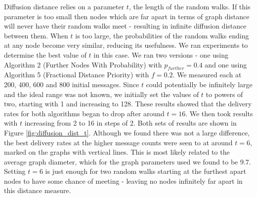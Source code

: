 \documentclass[bsc,frontabs,twoside,singlespacing,parskip,deptreport]{infthesis}     %
\begin{document}
Diffusion distance relies on a parameter $t$, the length of the random walks. If this parameter is too small then nodes which are far apart in terms of graph distance will never have their random walks meet - resulting in infinite diffusion distance between them. When $t$ is too large, the probabilities of the random walks ending at any node become very similar, reducing its usefulness. We ran experiments to determine the best value of $t$ in this case. We ran two versions - one using Algorithm 2 (Further Nodes With Probability) with $p_{further}=0.4$ and one using Algorithm 5 (Fractional Distance Priority) with $f=0.2$. We measured each at 200, 400, 600 and 800 initial messages. Since $t$ could potentially be infinitely large and the ideal range was not known, we initially set the values of $t$ to powers of two, starting with 1 and increasing to 128. These results showed that the delivery rates for both algorithms began to drop after around $t=16$. We then took results with $t$ increasing from 2 to 16 in steps of 2. Both sets of results are shown in Figure \ref{fig:diffusion_dist_t}. Although we found there was not a large difference, the best delivery rates at the higher message counts were seen to at around $t=6$, marked on the graphs with vertical lines. This is most likely related to the average graph diameter, which for the graph parameters used we found to be 9.7. Setting $t=6$ is just enough for two random walks starting at the furthest apart nodes to have some chance of meeting - leaving no nodes infinitely far apart in this distance measure.
\end{document}
